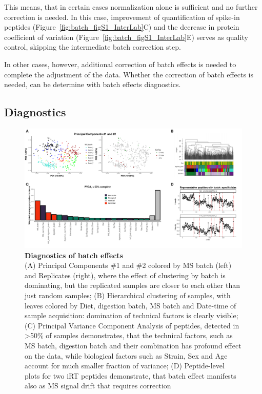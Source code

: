 \documentclass[num-refs]{wiley-article}
\begin{document}
This means, that in certain cases normalization alone is sufficient and no further correction is needed. In this case, improvement of quantification of spike-in peptides (Figure~\ref{fig:batch_figS1_InterLab}C) and the decrease in protein coefficient of variation (Figure~\ref{fig:batch_figS1_InterLab}E) serves as quality control, skipping the intermediate batch correction step.

In other cases, however, additional correction of batch effects is needed to complete the adjustment of the data. Whether the correction of batch effects is needed, can be determine with batch effects diagnostics.


\subsection{Diagnostics}

\begin{figure}[hbt]
	\includegraphics[width=\textwidth]{figures/Fig2_diagnostics.pdf}
	
	\caption{\textbf{Diagnostics of batch effects}  \\
		\footnotesize
		(A) Principal Components \#1 and \#2 colored by MS batch (left) and Replicates (right), where the effect of clustering by batch is dominating, but the replicated samples are closer to each other than just random samples; (B) Hierarchical clustering of samples, with leaves colored by Diet, digestion batch, MS batch and Date-time of sample acquisition: domination of technical factors is clearly visible; (C) Principal Variance Component Analysis of peptides, detected in >50\% of samples demonstrates, that the technical factors, such as MS batch, digestion batch and their combination has profound effect on the data, while biological factors such as Strain, Sex and Age account for much smaller fraction of variance; (D) Peptide-level plots for two iRT peptides demonstrate, that batch effect manifests also as MS signal drift that requires correction}
	\label{fig:batch_fig3_diagnostics}
\end{figure}
\end{document}
